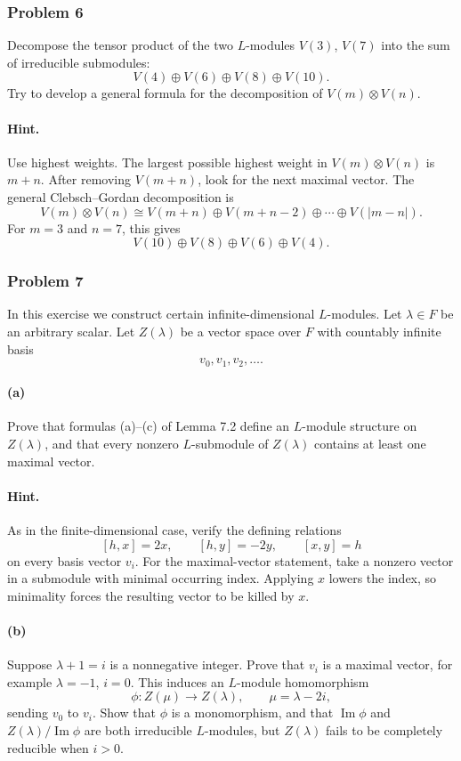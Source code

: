 \documentclass[12pt, a4paper]{article}
\begin{document}
\subsubsection{Problem 6}

Decompose the tensor product of the two \(L\)-modules \(V(3)\), \(V(7)\) into
the sum of irreducible submodules:
\[
V(4)\oplus V(6)\oplus V(8)\oplus V(10).
\]
Try to develop a general formula for the decomposition of \(V(m)\otimes V(n)\).

\paragraph{Hint.}
Use highest weights. The largest possible highest weight in
\(V(m)\otimes V(n)\) is \(m+n\). After removing \(V(m+n)\), look for the next
maximal vector. The general Clebsch--Gordan decomposition is
\[
V(m)\otimes V(n)
\cong
V(m+n)\oplus V(m+n-2)\oplus\cdots\oplus V(|m-n|).
\]
For \(m=3\) and \(n=7\), this gives
\[
V(10)\oplus V(8)\oplus V(6)\oplus V(4).
\]

\subsubsection{Problem 7}

In this exercise we construct certain infinite-dimensional \(L\)-modules. Let
\(\lambda\in F\) be an arbitrary scalar. Let \(Z(\lambda)\) be a vector space
over \(F\) with countably infinite basis
\[
v_0,v_1,v_2,\ldots .
\]

\paragraph{(a)}
Prove that formulas (a)--(c) of Lemma 7.2 define an \(L\)-module structure on
\(Z(\lambda)\), and that every nonzero \(L\)-submodule of \(Z(\lambda)\)
contains at least one maximal vector.

\paragraph{Hint.}
As in the finite-dimensional case, verify the defining relations
\[
[h,x]=2x,\qquad [h,y]=-2y,\qquad [x,y]=h
\]
on every basis vector \(v_i\). For the maximal-vector statement, take a
nonzero vector in a submodule with minimal occurring index. Applying \(x\)
lowers the index, so minimality forces the resulting vector to be killed by
\(x\).

\paragraph{(b)}
Suppose \(\lambda+1=i\) is a nonnegative integer. Prove that \(v_i\) is a
maximal vector, for example \(\lambda=-1\), \(i=0\). This induces an
\(L\)-module homomorphism
\[
\phi:Z(\mu)\longrightarrow Z(\lambda),
\qquad
\mu=\lambda-2i,
\]
sending \(v_0\) to \(v_i\). Show that \(\phi\) is a monomorphism, and that
\(\operatorname{Im}\phi\) and \(Z(\lambda)/\operatorname{Im}\phi\) are both
irreducible \(L\)-modules, but \(Z(\lambda)\) fails to be completely reducible
when \(i>0\).
\end{document}
